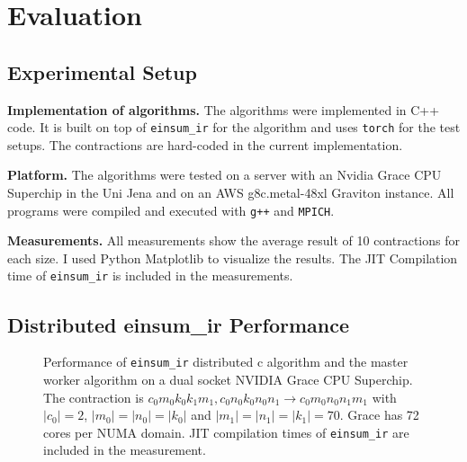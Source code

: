\section{Evaluation}

\subsection{Experimental Setup}

\textbf{Implementation of algorithms.}
The algorithms were implemented in C++ code.
It is built on top of \texttt{einsum\_ir} for the algorithm and uses \texttt{torch} for the test setups.
The contractions are hard-coded in the current implementation.

\textbf{Platform.}
The algorithms were tested on a server with an Nvidia Grace CPU Superchip in the Uni Jena and on an AWS g8c.metal-48xl Graviton instance.
All programs were compiled and executed with \texttt{g++} and \texttt{MPICH}.

\textbf{Measurements.}
All measurements show the average result of 10 contractions for each size.
I used Python Matplotlib\cite{matplotlib} to visualize the results.
The JIT Compilation time of \texttt{einsum\_ir} is included in the measurements.


\subsection{Distributed einsum\_ir Performance}

\begin{figure}[ht]
  \caption{
    Performance of \texttt{einsum\_ir} distributed c algorithm and the master worker algorithm on a dual socket NVIDIA Grace CPU Superchip.
    The contraction is $c_0m_0k_0k_1m_1, c_0n_0k_0n_0n_1 \rightarrow c_0m_0n_0n_1m_1$ with $|c_0|=2$, $|m_0|=|n_0|=|k_0|$ and $|m_1|=|n_1|=|k_1|=70$.
    Grace has 72 cores per NUMA domain.
    JIT compilation times of \texttt{einsum\_ir} are included in the measurement.
    }
  \label{fig:master_worker_perf}
\end{figure}

